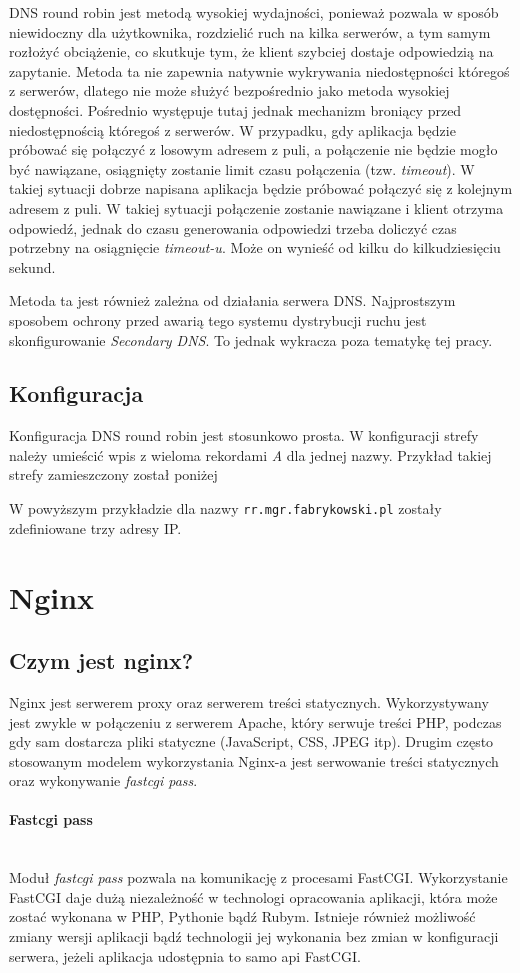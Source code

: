 {DNS round robin jest metodą wysokiej wydajności, ponieważ pozwala w sposób niewidoczny dla użytkownika, rozdzielić ruch na kilka serwerów, a tym samym rozłożyć obciążenie, co skutkuje tym, że klient szybciej dostaje odpowiedzią na zapytanie.
Metoda ta nie zapewnia natywnie wykrywania niedostępności któregoś z serwerów, dlatego nie może służyć bezpośrednio jako metoda wysokiej dostępności.
Pośrednio występuje tutaj jednak mechanizm broniący przed niedostępnością któregoś z serwerów. W przypadku, gdy aplikacja będzie próbować się połączyć z losowym adresem z puli, a połączenie nie będzie mogło być nawiązane, osiągnięty zostanie limit czasu połączenia (tzw. \textit{timeout}). W takiej sytuacji dobrze napisana aplikacja będzie próbować połączyć się z kolejnym adresem z puli.
W takiej sytuacji połączenie zostanie nawiązane i klient otrzyma odpowiedź, jednak do czasu generowania odpowiedzi trzeba doliczyć czas potrzebny na osiągnięcie \textit{timeout-u}. Może on wynieść od kilku do kilkudziesięciu sekund.

Metoda ta jest również zależna od działania serwera DNS.
Najprostszym sposobem ochrony przed awarią tego systemu dystrybucji ruchu jest skonfigurowanie \textit{Secondary DNS}. To jednak wykracza poza tematykę tej pracy.
\subsection{Konfiguracja}
Konfiguracja DNS round robin jest stosunkowo prosta.
W konfiguracji strefy należy umieścić wpis z wieloma rekordami \textit{A} dla jednej nazwy.
Przykład takiej strefy zamieszczony został poniżej

W powyższym przykładzie dla nazwy \texttt{rr.mgr.fabrykowski.pl} zostały zdefiniowane trzy adresy IP.
\section{Nginx}
\subsection{Czym jest nginx?}
Nginx jest serwerem proxy oraz serwerem treści statycznych.
Wykorzystywany jest zwykle w połączeniu z serwerem Apache, który serwuje treści PHP, podczas gdy sam dostarcza pliki statyczne (JavaScript, CSS, JPEG itp).
Drugim często stosowanym modelem wykorzystania Nginx-a jest serwowanie treści statycznych oraz wykonywanie \textit{fastcgi pass}.
\paragraph{Fastcgi pass} \hspace{0pt} \\
Moduł \textit{fastcgi pass} pozwala na komunikację z procesami FastCGI.
Wykorzystanie FastCGI daje dużą niezależność w technologi opracowania aplikacji, która może zostać wykonana w PHP, Pythonie bądź Rubym.
Istnieje również możliwość zmiany wersji aplikacji bądź technologii jej wykonania bez zmian w konfiguracji serwera, jeżeli aplikacja udostępnia to samo api FastCGI.

}
